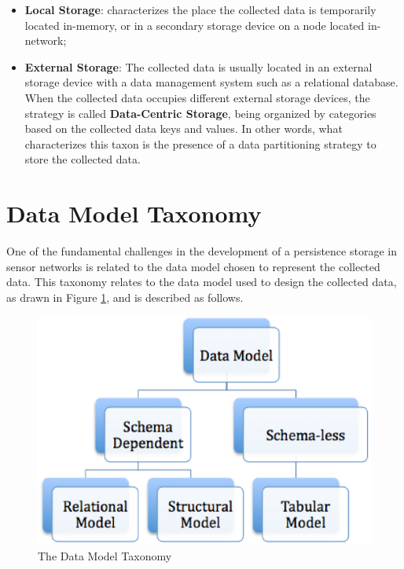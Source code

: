 \begin{itemize}
  \item \textbf{Local Storage}: characterizes the place the collected data is
  temporarily located in-memory, or in a secondary storage device on a node
  located in-network;
  \item \textbf{External Storage}: The collected data is usually located in an
  external storage device with a data management system such as a relational
  database. When the collected data occupies different external storage devices, the
  strategy is called \textbf{Data-Centric Storage}, being organized by
  categories based on the collected data keys and values. In other words, what
  characterizes this taxon is the presence of a data partitioning strategy to
  store the collected data.
\end{itemize}

\section{Data Model Taxonomy}

One of the fundamental challenges in the development of a persistence storage
in sensor networks is related to the data model chosen to represent the
collected data. This taxonomy relates to the data model used to design the 
collected data, as drawn in Figure \ref{fig:taxonomy-data-model}, and is 
described as follows.

\begin{figure}[h]
  \centering
  \includegraphics[scale=0.5]{../diagrams/taxonomy-data-model}
  \caption{The Data Model Taxonomy}
  \label{fig:taxonomy-data-model}
\end{figure}

